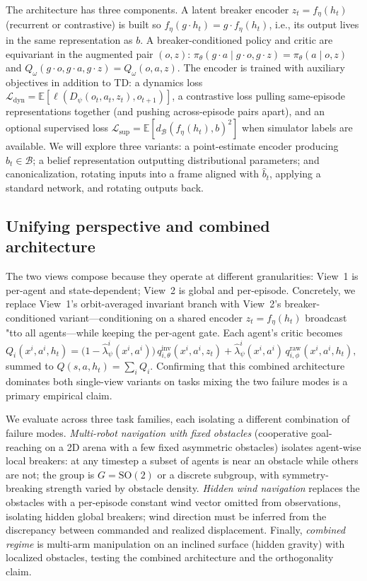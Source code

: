 \documentclass[11pt]{article}
\begin{document}
The architecture has three components. A latent breaker encoder $z_t = f_\eta(h_t)$ (recurrent or contrastive) is built so $f_\eta(g \cdot h_t) = g \cdot f_\eta(h_t)$, i.e., its output lives in the same representation as $b$. A breaker-conditioned policy and critic are equivariant in the augmented pair $(o, z)$: $\pi_\theta(g\!\cdot\!a \mid g\!\cdot\!o, g\!\cdot\!z) = \pi_\theta(a \mid o, z)$ and $Q_\omega(g\!\cdot\!o, g\!\cdot\!a, g\!\cdot\!z) = Q_\omega(o,a,z)$. The encoder is trained with auxiliary objectives in addition to TD: a dynamics loss $\mathcal{L}_{\text{dyn}} = \mathbb{E}[\ell(D_\psi(o_t, a_t, z_t), o_{t+1})]$, a contrastive loss pulling same-episode representations together (and pushing across-episode pairs apart), and an optional supervised loss $\mathcal{L}_{\text{sup}} = \mathbb{E}[d_\mathcal{B}(f_\eta(h_t), b)^2]$ when simulator labels are available. We will explore three variants: a point-estimate encoder producing $\widehat{b}_t \in \mathcal{B}$; a belief representation outputting distributional parameters; and canonicalization, rotating inputs into a frame aligned with $\widehat{b}_t$, applying a standard network, and rotating outputs back.

\subsection{Unifying perspective and combined architecture}
\label{sec:unified}
The two views compose because they operate at different granularities: View~1 is per-agent and state-dependent; View~2 is global and per-episode. Concretely, we replace View~1's orbit-averaged invariant branch with View~2's breaker-conditioned variant—conditioning on a shared encoder $z_t = f_\eta(h_t)$ broadcast "tto all agents—while keeping the per-agent gate. Each agent's critic becomes
$
Q_i(x^i, a^i, h_t) = \bigl(1 - \widehat{\lambda}^i_\psi(x^i, a^i)\bigr)\,q^{\text{inv}}_{i,\theta}(x^i, a^i, z_t) + \widehat{\lambda}^i_\psi(x^i, a^i)\,q^{\text{raw}}_{i,\phi}(x^i, a^i, h_t),
$
summed to $Q(s,a,h_t) = \sum_i Q_i$. Confirming that this combined architecture dominates both single-view variants on tasks mixing the two failure modes is a primary empirical claim.

We evaluate across three task families, each isolating a different combination of failure modes. \emph{Multi-robot navigation with fixed obstacles} (cooperative goal-reaching on a 2D arena with a few fixed asymmetric obstacles) isolates agent-wise local breakers: at any timestep a subset of agents is near an obstacle while others are not; the group is $G = \mathrm{SO}(2)$ or a discrete subgroup, with symmetry-breaking strength varied by obstacle density. \emph{Hidden wind navigation} replaces the obstacles with a per-episode constant wind vector omitted from observations, isolating hidden global breakers; wind direction must be inferred from the discrepancy between commanded and realized displacement. Finally, \emph{combined regime} is multi-arm manipulation on an inclined surface (hidden gravity) with localized obstacles, testing the combined architecture and the orthogonality claim.
\end{document}
